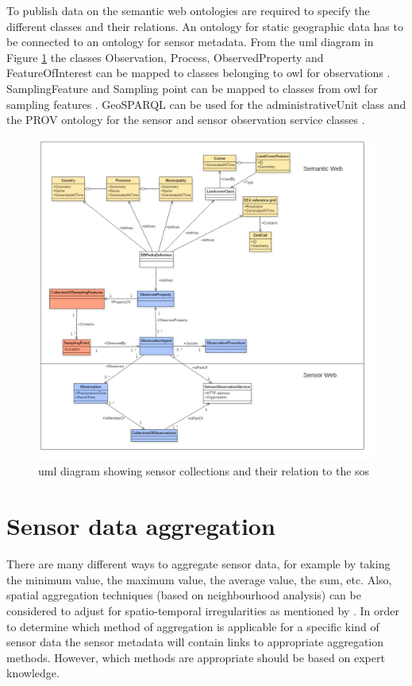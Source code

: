 To publish data on the semantic web ontologies are required to specify the different classes and their relations. An ontology for static geographic data has to be connected to an ontology for sensor metadata. From the \ac{uml} diagram in Figure \ref{fig:UML} the classes Observation, Process, ObservedProperty and FeatureOfInterest can be mapped to classes belonging to \ac{owl} for observations \citep{SSW:Cox}. SamplingFeature and Sampling point can be mapped to classes from \ac{owl} for sampling features \citep{SSW:Cox2}. GeoSPARQL can be used for the administrativeUnit class \citep{LD:OGC} and the PROV ontology for the sensor and sensor observation service classes \citep{LD:W3C2}. 


\begin{figure}
	\centering
	\includegraphics[width=1\linewidth]{UML/SensorLinks3.png}
	\caption{\ac{uml} diagram showing sensor collections and their relation to the \ac{sos}}
	\label{fig:UML}
\end{figure}

\section{Sensor data aggregation}
There are many different ways to aggregate sensor data, for example by taking the minimum value, the maximum value, the average value, the sum, etc. Also, spatial aggregation techniques (based on neighbourhood analysis) can be considered to adjust for spatio-temporal irregularities as mentioned by \cite{SW:Ganesan}. In order to determine which method of aggregation is applicable for a specific kind of sensor data the sensor metadata will contain links to appropriate aggregation methods. However, which methods are appropriate should be based on expert knowledge.

